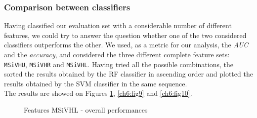 \vspace{0.5cm}

\subsubsection{Comparison between classifiers}

Having classified our evaluation set with a considerable number of different features, we could try to answer the question
whether one of the two considered classifiers outperforms the other. We used, as a metric for our analysis,
the \textit{AUC} and the \textit{accuracy}, and considered the three different complete feature sets: \texttt{MSiVHU}, \texttt{MSiVHR} and \texttt{MSiVHL}.
Having tried all the possible combinations, the sorted the results obtained by the \Gls{RF} classifier in ascending order and plotted the results obtained by the 
\Gls{SVM} classifier in the same sequence.\\
The results are showed on Figures \ref{ch6:fig8}, \ref{ch6:fig9} and \ref{ch6:fig10}.


\begin{figure}[!htb]
  \centering
    \hspace{1mm}
    \caption{Features MSiVHL - overall performances}
    \label{ch6:fig8}
\end{figure}

